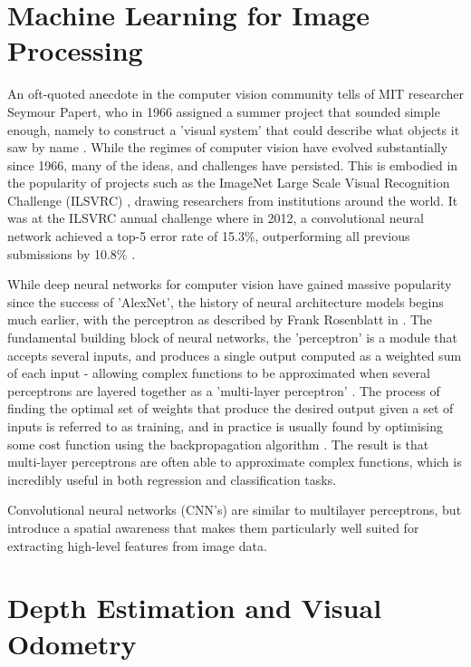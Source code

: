 \documentclass[openany]{book}
\begin{document}
\section{Machine Learning for Image Processing}

An oft-quoted anecdote in the computer vision community tells of MIT researcher Seymour Papert, who in 1966 assigned a summer project that sounded simple enough, namely to construct a 'visual system' that could describe what objects it saw by name \cite{papert1966vision}. While the regimes of computer vision have evolved substantially since 1966, many of the ideas, and challenges have persisted. This is embodied in the popularity of projects such as the ImageNet Large Scale Visual Recognition Challenge (ILSVRC) \cite{ilsvrc}, drawing researchers from institutions around the world. It was at the ILSVRC annual challenge where in 2012, a convolutional neural network achieved a top-5 error rate of 15.3\%, outperforming all previous submissions by 10.8\% \cite{krizhevsky2012alexnet}. 

While deep neural networks for computer vision have gained massive popularity since the success of 'AlexNet', the history of neural architecture models begins much earlier, with the perceptron as described by Frank Rosenblatt in \cite{rosenblatt1959neurodynamics}. The fundamental building block of neural networks, the 'perceptron' is a module that accepts several inputs, and produces a single output computed as a weighted sum of each input - allowing complex functions to be approximated when several perceptrons are layered together as a 'multi-layer perceptron' \cite{minsky1969perceptrons}. The process of finding the optimal set of weights that produce the desired output given a set of inputs is referred to as training, and in practice is usually found by optimising some cost function using the backpropagation algorithm \cite{rumelhart1986backprop}. The result is that multi-layer perceptrons are often able to approximate complex functions, which is incredibly useful in both regression and classification tasks.

Convolutional neural networks (CNN's) are similar to multilayer perceptrons, but introduce a spatial awareness that makes them particularly well suited for extracting high-level features from image data. 


\section{Depth Estimation and Visual Odometry}
\end{document}
